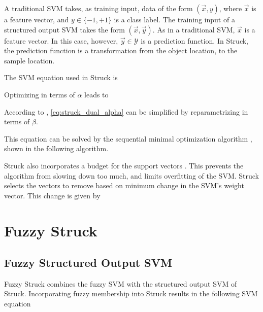 \documentclass{IEEEtran}
\begin{document}
A traditional SVM takes, as training input, data of the form \((\vec{x}, y)\), where
\(\vec{x}\) is a feature vector, and \(y \in \{-1, +1\}\) is a class label. The training input of
a structured output SVM takes the form \((\vec{x}, \vec{y})\). As in a traditional SVM,
\(\vec{x}\) is a feature vector. In this case, however, \(\vec{y} \in \mathcal{Y}\) is a prediction
function. In Struck, the prediction function is a transformation from the object location, to the
sample location.

The SVM equation used in Struck is
\struckEquation

Optimizing in terms of \(\alpha\) leads to
\struckDualAlpha

According to \cite{Bordes:2007:SMS:1273496.1273508}, \eqref{eq:struck_dual_alpha} can be simplified
by reparametrizing in terms of \(\beta\).
\struckDualBeta

This equation can be solved by the sequential minimal optimization algorithm
\cite{sequential-minimal-optimization-a-fast-algorithm-for-training-support-vector-machines}, shown
in the following algorithm.

\struckSmo

Struck also incorporates a budget for the support vectors \cite{6126251}. This prevents the
algorithm from slowing down too much, and limits overfitting of the SVM. Struck selects the vectors
to remove based on minimum change in the SVM's weight vector. This change is given by
\struckWeightChange

%
%

\section{Fuzzy Struck} %
\subsection{Fuzzy Structured Output SVM}
Fuzzy Struck combines the fuzzy SVM with the structured output SVM of Struck. Incorporating fuzzy
membership into Struck results in the following SVM equation
\fuzzyStruckEquation
\end{document}
